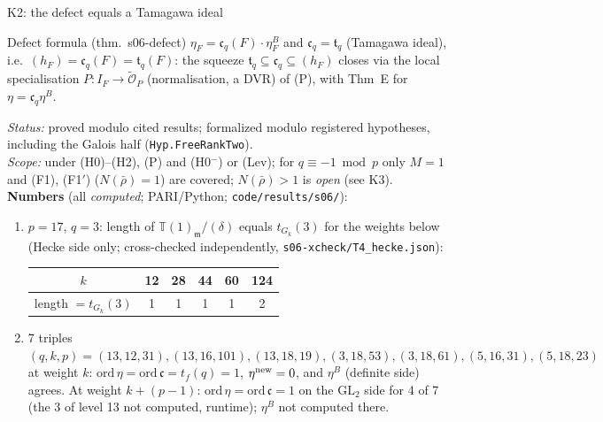 \begin{frame}[shrink=6]{K2: the defect equals a Tamagawa ideal}
  \scriptsize
  \begin{block}{Defect formula (thm.\ s06-defect)}
    $\eta_F=\mathfrak c_q(F)\cdot\eta^B_F$ and $\mathfrak c_q=\mathfrak t_q$ (Tamagawa ideal), i.e.\ $(h_F)=\mathfrak c_q(F)=\mathfrak t_q(F)$:
    the squeeze $\mathfrak t_q\subseteq\mathfrak c_q\subseteq(h_F)$ closes via the local specialisation $P:I_F\to\widetilde{\mathcal O}_P$ (normalisation, a DVR) of (P), with Thm~E for $\eta=\mathfrak c_q\eta^B$.
  \end{block}
  \emph{Status:} proved modulo cited results; formalized modulo registered hypotheses, including the Galois half (\texttt{Hyp.FreeRankTwo}).\\
  \emph{Scope:} under (H0)--(H2), (P) and (H0$^-$) or (Lev); for $q\equiv-1 \bmod p$ only $M=1$ and (F1), (F1$'$) ($N(\bar\rho)=1$) are covered; $N(\bar\rho)>1$ is \emph{open} (see K3).\\[2pt]
  \textbf{Numbers} (all \emph{computed}; PARI/Python; \texttt{code/results/s06/}):
  \begin{enumerate}\setlength{\itemsep}{1pt}
    \item[(T4)] $p=17$, $q=3$: length of $\mathbb T(1)_{\mathfrak m}/(\delta)$ equals $t_{G_k}(3)$ for the weights below (Hecke side only; cross-checked independently, \texttt{s06-xcheck/T4\_hecke.json}):
    \begin{center}\begin{tabular}{c|ccccc}
      $k$ & 12 & 28 & 44 & 60 & 124\\\hline
      length $=t_{G_k}(3)$ & 1 & 1 & 1 & 1 & 2
    \end{tabular}\end{center}
    \item[(T5)] 7 triples $(q,k,p)=(13,12,31),(13,16,101),(13,18,19),(3,18,53),(3,18,61),(5,16,31),(5,18,23)$ at weight $k$: $\mathrm{ord}\,\eta=\mathrm{ord}\,\mathfrak c=t_f(q)=1$, $\eta^{\rm new}=0$, and $\eta^B$ (definite side) agrees. At weight $k+(p-1)$: $\mathrm{ord}\,\eta=\mathrm{ord}\,\mathfrak c=1$ on the $\mathrm{GL}_2$ side for 4 of 7 (the 3 of level 13 not computed, runtime); $\eta^B$ not computed there.

\end{enumerate}
\end{frame}

